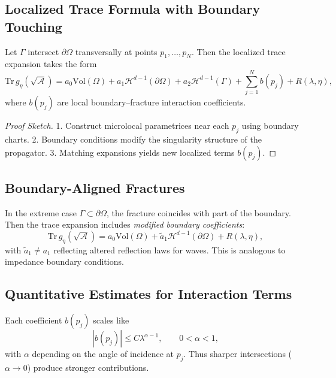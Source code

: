 \subsection{Localized Trace Formula with Boundary Touching}

\begin{theorem}
\label{thm:boundary-touch}
Let $\Gamma$ intersect $\partial \Omega$ transversally at points
$p_1,\dots,p_N$.  
Then the localized trace expansion takes the form
\[
\mathrm{Tr}\, g_\eta(\sqrt{\mathcal{A}}) =
a_0 \mathrm{Vol}(\Omega) +
a_1 \mathcal{H}^{d-1}(\partial \Omega) +
a_2 \mathcal{H}^{d-1}(\Gamma) +
\sum_{j=1}^N b(p_j) + R(\lambda,\eta),
\]
where $b(p_j)$ are local boundary–fracture interaction coefficients.
\end{theorem}

\begin{proof}[Proof Sketch]
1. Construct microlocal parametrices near each $p_j$ using boundary
charts.  
2. Boundary conditions modify the singularity structure of the
propagator.  
3. Matching expansions yields new localized terms $b(p_j)$.
\end{proof}

\subsection{Boundary-Aligned Fractures}

In the extreme case $\Gamma \subset \partial \Omega$, the fracture
coincides with part of the boundary.  
Then the trace expansion includes \emph{modified boundary coefficients}:
\[
\mathrm{Tr}\, g_\eta(\sqrt{\mathcal{A}}) =
a_0 \mathrm{Vol}(\Omega) +
\tilde{a}_1 \mathcal{H}^{d-1}(\partial \Omega) +
R(\lambda,\eta),
\]
with $\tilde{a}_1 \neq a_1$ reflecting altered reflection laws for
waves.  
This is analogous to impedance boundary conditions.

\subsection{Quantitative Estimates for Interaction Terms}

\begin{proposition}
\label{prop:boundary-scaling}
Each coefficient $b(p_j)$ scales like
\[
|b(p_j)| \leq C \lambda^{\alpha-1}, \qquad 0<\alpha<1,
\]
with $\alpha$ depending on the angle of incidence at $p_j$.  
Thus sharper intersections ($\alpha \to 0$) produce stronger
contributions.
\end{proposition}

